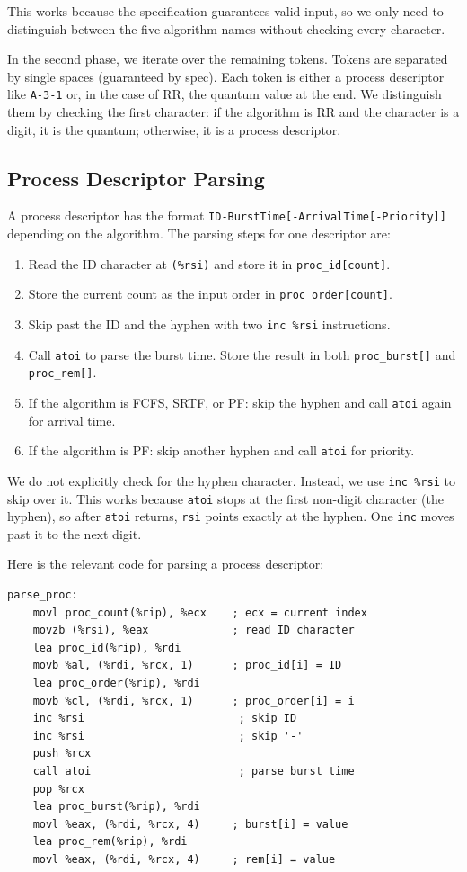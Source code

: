 \documentclass[a4paper,12pt]{article}
\begin{document}
This works because the specification guarantees valid input, so we only need to distinguish between the five algorithm names without checking every character.

In the second phase, we iterate over the remaining tokens. Tokens are separated by single spaces (guaranteed by spec). Each token is either a process descriptor like \texttt{A-3-1} or, in the case of RR, the quantum value at the end. We distinguish them by checking the first character: if the algorithm is RR and the character is a digit, it is the quantum; otherwise, it is a process descriptor.

\subsection{Process Descriptor Parsing}

A process descriptor has the format \texttt{ID-BurstTime[-ArrivalTime[-Priority]]} depending on the algorithm. The parsing steps for one descriptor are:

\begin{enumerate}
    \item Read the ID character at \texttt{(\%rsi)} and store it in \texttt{proc\_id[count]}.
    \item Store the current count as the input order in \texttt{proc\_order[count]}.
    \item Skip past the ID and the hyphen with two \texttt{inc \%rsi} instructions.
    \item Call \texttt{atoi} to parse the burst time. Store the result in both \texttt{proc\_burst[]} and \texttt{proc\_rem[]}.
    \item If the algorithm is FCFS, SRTF, or PF: skip the hyphen and call \texttt{atoi} again for arrival time.
    \item If the algorithm is PF: skip another hyphen and call \texttt{atoi} for priority.
\end{enumerate}

We do not explicitly check for the hyphen character. Instead, we use \texttt{inc \%rsi} to skip over it. This works because \texttt{atoi} stops at the first non-digit character (the hyphen), so after \texttt{atoi} returns, \texttt{rsi} points exactly at the hyphen. One \texttt{inc} moves past it to the next digit.

Here is the relevant code for parsing a process descriptor:

\begin{lstlisting}[style=AsmStyle]
parse_proc:
    movl proc_count(%rip), %ecx    ; ecx = current index
    movzb (%rsi), %eax             ; read ID character
    lea proc_id(%rip), %rdi
    movb %al, (%rdi, %rcx, 1)      ; proc_id[i] = ID
    lea proc_order(%rip), %rdi
    movb %cl, (%rdi, %rcx, 1)      ; proc_order[i] = i
    inc %rsi                        ; skip ID
    inc %rsi                        ; skip '-'
    push %rcx
    call atoi                       ; parse burst time
    pop %rcx
    lea proc_burst(%rip), %rdi
    movl %eax, (%rdi, %rcx, 4)     ; burst[i] = value
    lea proc_rem(%rip), %rdi
    movl %eax, (%rdi, %rcx, 4)     ; rem[i] = value
\end{lstlisting}
\end{document}
